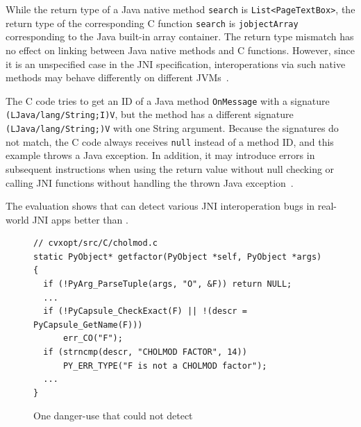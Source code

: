 While the return type of a Java native method {\tt search}
is {\tt List<PageTextBox>}, the return type of the corresponding C function
{\tt search} is {\tt jobjectArray} corresponding to the Java built-in array
container. The return type mismatch has no effect on linking between
Java native methods and C functions. However, since it is an unspecified case in
the JNI specification, interoperations via such native methods may behave
differently on different JVMs~\cite{LeeASE20}. 


The C code tries to get an ID of a Java method {\tt OnMessage} with a
signature \texttt{(LJava/lang/String;I)V}, but the method has a different
signature \texttt{(LJava/lang/String;)V} with one String argument. Because
the signatures do not match, the C code always receives {\tt null}
instead of a method ID, and this example throws a Java exception. In
addition, it may introduce errors in subsequent instructions when using the
return value without null checking or calling JNI functions without handling the
thrown Java exception~\cite{jniexcept}.

The evaluation shows that \ours can detect various JNI interoperation bugs in
real-world JNI apps better than \lees.



\begin{figure}[ht!]
  \centering
  \vspace{2mm}
  \begin{lstlisting}[style=cpp,xleftmargin=2.5em]
// cvxopt/src/C/cholmod.c
static PyObject* getfactor(PyObject *self, PyObject *args)
{
  if (!PyArg_ParseTuple(args, "O", &F)) return NULL;
  ...
  if (!PyCapsule_CheckExact(F) || !(descr = PyCapsule_GetName(F)))
      err_CO("F");
  if (strncmp(descr, "CHOLMOD FACTOR", 14))
      PY_ERR_TYPE("F is not a CHOLMOD factor");
  ...
}
  \end{lstlisting}
    \vspace*{-.5em}
  \caption{One danger-use that \ours could not detect}
  \label{fig:cvxopt}
\end{figure}

